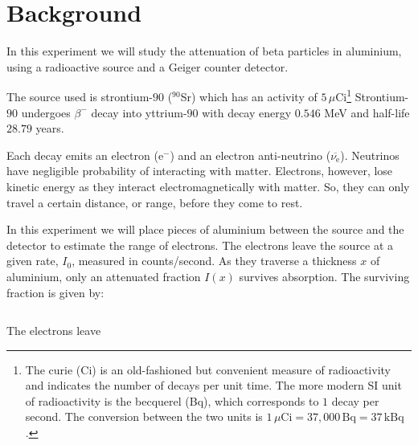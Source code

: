 \section{Background}%

In this experiment we will study the attenuation of beta particles in aluminium, using a radioactive source and a Geiger counter detector. 

The source used is strontium-$90$ ($^{90}$Sr) which has an activity of $5\,\mu$Ci\footnote{The curie (Ci) is an old-fashioned but convenient measure of radioactivity and indicates the number of decays per unit time. The more modern SI unit of radioactivity is the becquerel (Bq), which corresponds to $1$ decay per second. The conversion between the two units is $1\,\mu\textrm{Ci} = 37,000\,\textrm{Bq} = 37\,\textrm{kBq}$.} Strontium-$90$ undergoes $\beta^{-}$ decay into yttrium-$90$ with decay energy $0.546$ MeV and half-life $28.79$ years. 

Each decay emits an electron ($\mathrm{e}^-$)  and an electron anti-neutrino ($\overbar{\nu_\mathrm{e}}$). Neutrinos have negligible probability of interacting with matter. Electrons, however, lose kinetic energy as they interact electromagnetically with matter. So, they can only travel a certain distance, or range, before they come to rest.

In this experiment we will place pieces of aluminium between the source and the detector to estimate the range of electrons.  The electrons leave the source at a given rate, $I_0$, measured in counts/second. As they traverse a thickness $x$ of aluminium, only an attenuated fraction $I(x)$ survives absorption. The surviving fraction is given by:

\begin{displaymath}

\end{displaymath}

The electrons leave 

